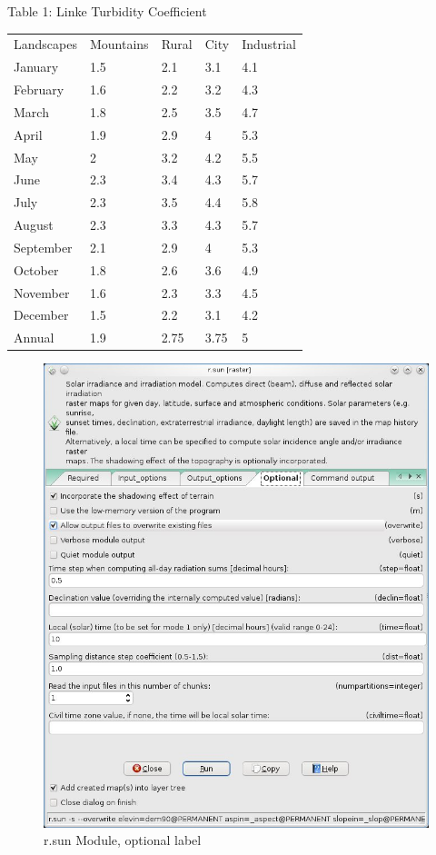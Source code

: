 Table 1: Linke Turbidity Coefficient
\begin{center}
\begin{tabular}{lllll}
Landscapes & Mountains & Rural & City & Industrial\\
January & 1.5 & 2.1 & 3.1 & 4.1\\
February & 1.6 & 2.2 & 3.2 & 4.3\\
March & 1.8 & 2.5 & 3.5 & 4.7\\
April & 1.9 & 2.9 & 4 & 5.3\\
May & 2 & 3.2 & 4.2 & 5.5\\
June & 2.3 & 3.4 & 4.3 & 5.7\\
July & 2.3 & 3.5 & 4.4 & 5.8\\
August & 2.3 & 3.3 & 4.3 & 5.7\\
September & 2.1 & 2.9 & 4 & 5.3\\
October & 1.8 & 2.6 & 3.6 & 4.9\\
November & 1.6 & 2.3 & 3.3 & 4.5\\
December & 1.5 & 2.2 & 3.1 & 4.2\\
Annual & 1.9 & 2.75 & 3.75 & 5
\end{tabular}
\linebreak
\end{center}

\begin{figure}[htbp]
   \centering
   \includegraphics[scale=0.4]{gipe024.png}
   \caption{r.sun Module, optional label}
   \label{fig:gipe024}
\end{figure}

